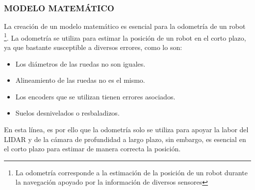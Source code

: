 \subsubsection{MODELO MATEMÁTICO}
La creación de un modelo matemático es esencial para la odometría de un robot \footnote{La odometría corresponde a la estimación de la posición de un robot durante la navegación apoyado por la información de diversos sensores}. La odometría se utiliza para estimar la posición de un robot en el corto plazo, ya que bastante susceptible a diversos errores, como lo son:
\begin{itemize}
    \item Los diámetros de las ruedas no son iguales.
    \item Alineamiento de las ruedas no es el mismo.
    \item Los encoders que se utilizan tienen errores asociados.
    \item Suelos desnivelados o resbaladizos.
\end{itemize}
En esta línea, es por ello que la odometría solo se utiliza para apoyar la labor del LIDAR y de la cámara de profundidad a largo plazo, sin embargo, es esencial en el corto plazo para estimar de manera correcta la posición. 

